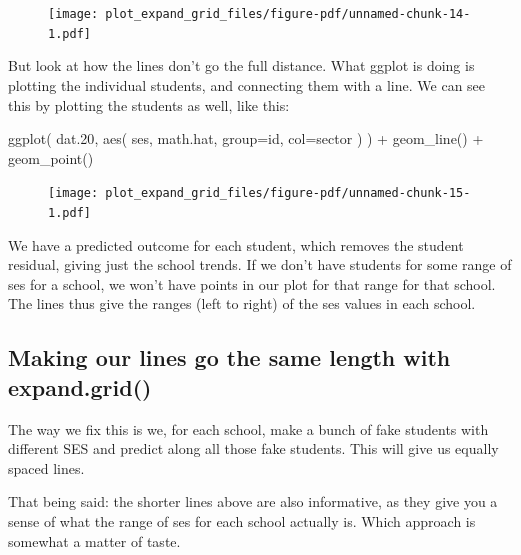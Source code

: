 \documentclass[
  letterpaper,
  DIV=11,
  numbers=noendperiod]{scrreprt}
\newenvironment{Shaded}{\begin{snugshade}}{\end{snugshade}}
\newcommand{\AttributeTok}[1]{\textcolor[rgb]{0.49,0.56,0.16}{#1}}
\newcommand{\FloatTok}[1]{\textcolor[rgb]{0.25,0.63,0.44}{#1}}
\newcommand{\FunctionTok}[1]{\textcolor[rgb]{0.02,0.16,0.49}{#1}}
\newcommand{\NormalTok}[1]{\textcolor[rgb]{0.00,0.44,0.13}{#1}}
\newcommand{\SpecialCharTok}[1]{\textcolor[rgb]{0.25,0.44,0.63}{#1}}
\begin{document}
\begin{figure}[H]

{\centering \texttt{[image: plot\_expand\_grid\_files/figure-pdf/unnamed-chunk-14-1.pdf]}

}

\end{figure}

But look at how the lines don't go the full distance. What ggplot is
doing is plotting the individual students, and connecting them with a
line. We can see this by plotting the students as well, like this:

\begin{Shaded}
\begin{Highlighting}[]
\FunctionTok{ggplot}\NormalTok{( dat}\FloatTok{.20}\NormalTok{, }\FunctionTok{aes}\NormalTok{( ses, math.hat, }\AttributeTok{group=}\NormalTok{id, }\AttributeTok{col=}\NormalTok{sector ) ) }\SpecialCharTok{+}
  \FunctionTok{geom\_line}\NormalTok{() }\SpecialCharTok{+}
  \FunctionTok{geom\_point}\NormalTok{()}
\end{Highlighting}
\end{Shaded}

\begin{figure}[H]

{\centering \texttt{[image: plot\_expand\_grid\_files/figure-pdf/unnamed-chunk-15-1.pdf]}

}

\end{figure}

We have a predicted outcome for each student, which removes the student
residual, giving just the school trends. If we don't have students for
some range of ses for a school, we won't have points in our plot for
that range for that school. The lines thus give the ranges (left to
right) of the ses values in each school.

\hypertarget{making-our-lines-go-the-same-length-with-expand.grid}{%
\subsection{Making our lines go the same length with
expand.grid()}\label{making-our-lines-go-the-same-length-with-expand.grid}}

The way we fix this is we, for each school, make a bunch of fake
students with different SES and predict along all those fake students.
This will give us equally spaced lines.

That being said: the shorter lines above are also informative, as they
give you a sense of what the range of ses for each school actually is.
Which approach is somewhat a matter of taste.
\end{document}
